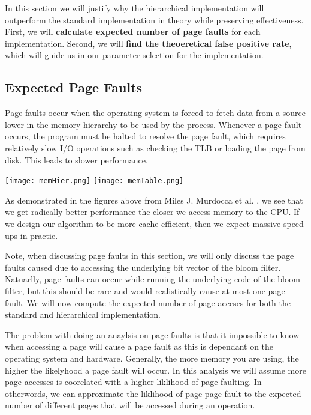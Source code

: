 In this section we will justify why the hierarchical implementation will outperform the standard implementation in theory while preserving effectiveness.
First, we will \textbf{calculate expected number of page faults} for  each implementation.
Second, we will \textbf{find the theoeretical false positive rate}, which will guide us in our parameter selection for the implementation.

\subsection{Expected Page Faults}
Page faults occur when the operating system is forced to fetch data from a source lower in the memory hierarchy to be used by the process.
Whenever a page fault occurs, the program must be halted to resolve the page fault, which requires relatively slow I/O operations such as checking the TLB or loading the page from disk.
This leads to slower performance.

\begin{center}
    \texttt{[image: memHier.png]}
    \texttt{[image: memTable.png]}

    \cite[Murdocca et al.]{Murdocca}
\end{center}

As demonstrated in the figures above from Miles J. Murdocca et al. \cite{Murdocca}, we see that we get radically better performance the closer we access memory to the CPU.
If we design our algorithm to be more cache-efficient, then we expect massive speed-ups in practie. 

Note, when discussing page faults in this section, we will only discuss the page faults caused due to accessing the underlying bit vector of the bloom filter.
Natuarlly, page faults can occur while running the underlying code of the bloom filter, but this should be rare and would realistically cause at most one page fault.
We will now compute the expected number of page acceses for both the standard and hierarchical implementation.

The problem with doing an anaylsis on page faults is that it impossible to know when accessing a page will cause a page fault as this is dependant on the operating system and hardware.
Generally, the more memory you are using, the higher the likelyhood a page fault will occur.
In this analysis we will assume more page accesses is coorelated with a higher liklihood of page faulting.
In otherwords, we can approximate the liklihood of page page fault to the expected number of different pages that will be accessed during an operation.


